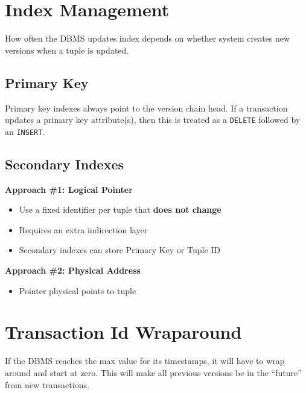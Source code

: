 \documentclass[11pt]{article}
\begin{document}
\section{Index Management}
How often the DBMS updates index depends on whether system creates new versions when a 
tuple is updated.

\subsection*{Primary Key}
Primary key indexes always point to the version chain head.
If a transaction updates a primary key attribute(s), then this is treated as a \texttt{DELETE} 
followed by an \texttt{INSERT}.

\subsection*{Secondary Indexes}
        
\textbf{Approach \#1: Logical Pointer}
\begin{itemize}
    \item Use a fixed identifier per tuple that \textbf{does not change}
    \item Requires an extra indirection layer
    \item Secondary indexes can store Primary Key or Tuple ID
\end{itemize}

\textbf{Approach \#2: Physical Address}
\begin{itemize}
    \item Pointer physical points to tuple
\end{itemize}

\section{Transaction Id Wraparound}
If the DBMS reaches the max value for its timestamps, it will have to wrap around and 
start at zero. This will make all previous versions be in the ``future'' from new transactions.
\end{document}
